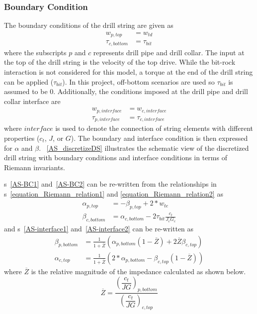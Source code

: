\subsubsection{Boundary Condition}
The boundary conditions of the drill string are given as
\begin{align}
  w_{p,top} &= w_{td} \label{AS-BC1} \\
  \tau_{c,bottom} &= \tau_{bit} \label{AS-BC2}
\end{align}
where the subscripts $p$ and $c$ represents drill pipe and drill collar.  The input at the top of the drill string is the velocity of the top drive.  While the bit-rock interaction is not considered for this model, a torque at the end of the drill string can be applied ($\tau_{bit}$). In this project, off-bottom scenarios are used so $\tau_{bit}$ is assumed to be 0. Additionally, the conditions imposed at the drill pipe and drill collar interface are
\begin{align}
  w_{p,interface} &= w_{c,interface} \label{AS-interface1} \\
  \tau_{p,interface} &= \tau_{c,interface} \label{AS-interface2}
\end{align}
where $interface$ is used to denote the connection of string elements with different properties ($c_t$, $J$, or $G$). The boundary and interface condition is then expressed for $\alpha$ and $\beta$. \figurename~\ref{AS_discretizeDS} illustrates the schematic view of the discretized drill string with boundary conditions and interface conditions in terms of Riemann invariants.

\equationname{}s~\ref{AS-BC1} and~\ref{AS-BC2} can be re-written from the relationships in \equationname{}s~\ref{equation_Riemann_relation1} and \ref{equation_Riemann_relation2} as
\begin{align}
  \alpha_{p,top} &= -\beta_{p,top} + 2*w_{te} \label{AS-riemannBC1} \\
  \beta_{c,bottom} &= \alpha_{c,bottom} - 2\tau_{bit} \frac{c_t}{J_c G_c} \label{AS-riemannBC2}
\end{align}
and \equationname{}s~\ref{AS-interface1} and~\ref{AS-interface2} can be re-written as
\begin{align}\label{AS-riemanninterface}
	\beta_{p,bottom} &= \frac{1}{1+\overline{Z}}\left(\alpha_{p,bottom}(1-\overline{Z}) + 2\overline{Z}\beta_{c,top} \right) \\
	\alpha_{c,top} &= \frac{1}{1+\overline{Z}}\left(2*\alpha_{p,bottom} - \beta_{c,top}(1-\overline{Z})\right)
\end{align}
where $\overline{Z}$ is the relative magnitude of the impedance calculated as shown below.
\begin{equation}\label{AS_Zbar}
  \overline{Z} = \dfrac{\left(\dfrac{c_t}{JG}\right)_{p,bottom}}{\left(\dfrac{c_t}{JG}\right)_{c,top}}
\end{equation}

